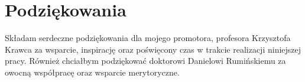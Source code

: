 %

\chapter*{Podziękowania}
\label{sec:acknowledgement}
\vspace*{-10mm}

Składam serdeczne podziękowania dla mojego promotora, profesora Krzysztofa Krawca za wsparcie, inspirację oraz poświęcony czas w trakcie realizacji niniejszej pracy. Również chciałbym podziękować doktorowi Danielowi Rumińskiemu za owocną współpracę oraz wsparcie merytoryczne.

